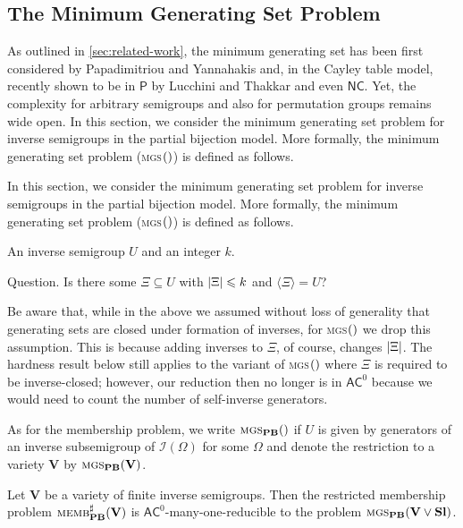 \documentclass[anonymous,letter,UKenglish,cleveref,autoref,thm-restate]{lipics-v2021}
\makeatletter
\renewcommand{\leq}{\leqslant}
\newcommand{\sse}{\subseteq}
\newcommand{\abs}[1] {\ensuremath\left|#1\right|}
\newcommand{\gen}[1]{\langle #1 \rangle}
\newcommand{\Ptime}{\ensuremath{\mathsf{P}}\xspace}
\newcommand{\ACz}{\ensuremath{\mathsf{AC}^0}\xspace}
\newcommand{\NC}{\ensuremath{\mathsf{NC}}\xspace}
\newcommand{\vV}{\ensuremath{\mathbf{V}}}
\newcommand{\vSl}{\ensuremath{\mathbf{Sl}}}
\newcommand{\ISym}{\cI}
\newcommand{\cI}{\mathcal{I}}
\theoremstyle{plain}
\theoremstyle{plain}
\providecommand\iitem{}
\providecommand\qitem{}
\newcommand\decproblem@iitem@label{\rlap{Input.}\phantom{Question.}}
\newcommand\decproblem@qitem@label{Question.}
\newenvironment{decproblem}{\begin{description}\begin{samepage}\renewcommand{\iitem}{\item[\decproblem@iitem@label]}\renewcommand{\qitem}{\item[\decproblem@qitem@label]}}{\end{samepage}\end{description}}
\newcommand{\dMembS}[2][]{\textup{\textsc{memb${}^{\sharp}_{\mathbf{#1}}\expandafter\ifx\expandafter\relax\detokenize{#2}\relax\else(#2)\fi$}}}
\newcommand{\dMGS}[2][]{\textup{\textsc{mgs${}_{\mathbf{#1}}\expandafter\ifx\expandafter\relax\detokenize{#2}\relax\else(#2)\fi$}}}
\makeatother
\begin{document}
\subsection{The Minimum Generating Set Problem}

As outlined in \cref{sec:related-work}, the minimum generating set has been first considered by Papadimitriou and Yannahakis \cite{PapadimitriouY96} and, in the Cayley table model, recently shown to be in \Ptime by Lucchini and Thakkar \cite{LucchiniT24} and even \NC \cite{CollinsGLW24}.
Yet, the complexity for arbitrary semigroups and also for permutation groups remains wide open.
In this section, we consider the minimum generating set problem for inverse semigroups in the partial bijection model. More formally, the minimum generating set problem (\dMGS{}) is defined as follows.

In this section, we consider the minimum generating set problem for inverse semigroups in the partial bijection model. More formally, the minimum generating set problem (\dMGS{}) is defined as follows.

\begin{decproblem}
	\iitem An inverse semigroup $U$ and an integer $k$.
	\qitem Is there some $\Xi \sse U$ with $\abs{\Xi} \leq k$ and $\gen{\Xi} = U$?
\end{decproblem}

Be aware that, while in the above we assumed without loss of generality that generating sets are closed under formation of inverses, for \dMGS{} we drop this assumption.
This is because adding inverses to $\Xi$, of course, changes $\abs{\Xi}$.
The hardness result below still applies to the variant of \dMGS{} where $\Xi$ is required to be inverse-closed; however, our reduction then no longer is in \ACz because we would need to count the number of self-inverse generators.

As for the membership problem, we write $\dMGS[PB]{}$ if $U$ is given by generators of an inverse subsemigroup of $\ISym(\Omega)$ for some $\Omega$ and denote the restriction to a variety $\vV$ by $\dMGS[PB]{\vV}$.



\begin{lemma}\label{lem:mgs-reduction}
	Let $\vV$ be a variety of finite inverse semigroups.
  Then the restricted membership problem $\dMembS[PB]{\vV}$ is \ACz-many-one-reducible to the problem $\dMGS[PB]{\vV \vee \vSl}$.
\end{lemma}
\end{document}
